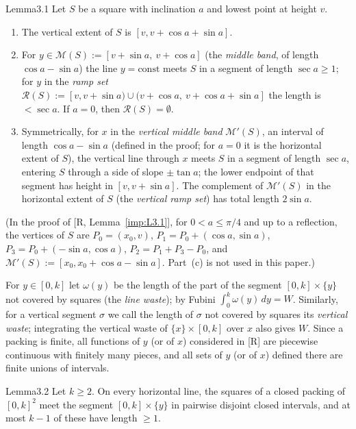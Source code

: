 \documentclass[11pt]{amsart}
\theoremstyle{definition}
\theoremstyle{remark}
\numberwithin{equation}{section}
\begin{document}
\begin{ImpStatement}{Lemma}{3.1}\label{imp:L3.1}
Let $S$ be a square with inclination $a$ and lowest point at height $v$.
\begin{enumerate}[label=(\alph*)]
\item The vertical extent of $S$ is $[v,v+\cos a+\sin a]$.
\item For $y\in\mathcal M(S):=[v+\sin a,\ v+\cos a]$ (the \emph{middle band}, of length $\cos a-\sin a$) the line
$y=\mathrm{const}$ meets $S$ in a segment of length $\sec a\ge 1$; for $y$ in the \emph{ramp set}
$\mathcal R(S):=[v,v+\sin a)\cup(v+\cos a,\ v+\cos a+\sin a]$ the length is $<\sec a$. If $a=0$, then $\mathcal R(S)=\emptyset$.
\item Symmetrically, for $x$ in the \emph{vertical middle band} $\mathcal M'(S)$, an interval of length
$\cos a-\sin a$ \textup{(}defined in the proof; for $a=0$ it is the horizontal extent of $S$\textup{)}, the vertical line through $x$ meets $S$ in a segment of length $\sec a$, entering $S$ through a
side of slope $\pm\tan a$; the lower endpoint of that segment has height in $[v,v+\sin a]$. The complement of
$\mathcal M'(S)$ in the horizontal extent of $S$ (the \emph{vertical ramp set}) has total length $2\sin a$.
\end{enumerate}
\end{ImpStatement}

(In the proof of [R, Lemma~\ref{imp:L3.1}], for $0<a\le\pi/4$ and up to a reflection, the vertices of $S$ are
$P_0=(x_0,v)$, $P_1=P_0+(\cos a,\sin a)$, $P_3=P_0+(-\sin a,\cos a)$, $P_2=P_1+P_3-P_0$, and
$\mathcal M'(S):=[x_0,x_0+\cos a-\sin a]$. Part~(c) is not used in this paper.)

For $y\in[0,k]$ let $\omega(y)$ be the length of the part of the segment $[0,k]\times\{y\}$ not covered by squares
(the \emph{line waste}); by Fubini $\int_0^k\omega(y)\,dy=W$. Similarly, for a vertical segment $\sigma$ we call the
length of $\sigma$ not covered by squares its \emph{vertical waste}; integrating the vertical waste of
$\{x\}\times[0,k]$ over $x$ also gives $W$. Since a packing is finite, all functions of $y$ (or of $x$) considered
in [R] are piecewise continuous with finitely many pieces, and all sets of $y$ (or of $x$) defined there are finite
unions of intervals.

\begin{ImpStatement}{Lemma}{3.2}\label{imp:L3.2}
Let $k\ge 2$. On every horizontal line, the squares of a closed packing of $[0,k]^2$ meet the segment
$[0,k]\times\{y\}$ in pairwise disjoint closed intervals, and at most $k-1$ of these have length $\ge1$.
\end{ImpStatement}
\end{document}
